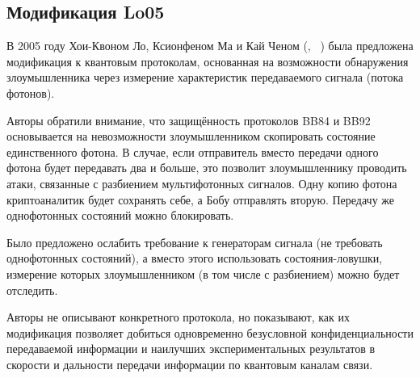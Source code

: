 \subsection{Модификация Lo05}

В 2005 году  Хои-Квоном Ло, Ксионфеном Ма и Кай Ченом (, ~\cite{Lo:Ma:Chen:2004, Lo:Ma:Chen:2005}) была предложена модификация к квантовым протоколам, основанная на возможности обнаружения злоумышленника через измерение характеристик передаваемого сигнала (потока фотонов).

Авторы обратили внимание, что защищённость протоколов BB84 и BB92 основывается на невозможности злоумышленником скопировать состояние единственного фотона. В случае, если отправитель вместо передачи одного фотона будет передавать два и больше, это позволит злоумышленнику проводить атаки, связанные с разбиением мультифотонных сигналов. Одну копию фотона криптоаналитик будет сохранять себе, а Бобу отправлять вторую. Передачу же однофотонных состояний можно блокировать.

Было предложено ослабить требование к генераторам сигнала (не требовать однофотонных состояний), а вместо этого использовать состояния-ловушки, измерение которых злоумышленником (в том числе с разбиением) можно будет отследить.

Авторы не описывают конкретного протокола, но показывают, как их модификация позволяет добиться одновременно безусловной конфиденциальности передаваемой информации и наилучших экспериментальных результатов в скорости и дальности передачи информации по квантовым каналам связи.
